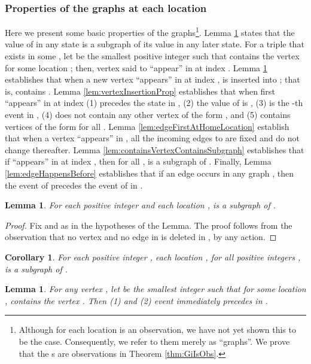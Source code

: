 \documentclass[11pt]{article}
\numberwithin{theorem}{section}
\newtheorem{lemma}[theorem]{Lemma}
\newtheorem{corollary}[theorem]{Corollary}
\begin{document}
\subsubsection{Properties of the graphs  at each location }
\label{subsubsec:proofPartOne}



Here we present some basic properties of the  graphs\footnote{Although  for each location  is an observation, we have not yet shown this to be the case. Consequently, we refer to them merely as ``graphs''. We prove that the s are observations in Theorem \ref{thm:GiIsObs}.}.
Lemma \ref{prop:subgraphNext} states that the value of  in any state is a subgraph of its value in any later state.
For a triple  that exists in some , let  be the smallest positive integer such that  contains the vertex  for some location ; then, vertex  said to ``appear'' in  at index .
Lemma \ref{lem:vertexFirstAtHomeLocation} establishes that when a new vertex  ``appears'' in  at index ,  is inserted into ; that is,  contains . 
Lemma \ref{lem:vertexInsertionProp} establishes that  when  first ``appears'' in  at index  (1)  precedes the state  in , (2) the value of  is , (3)  is the -th  event in , (4)  does not contain any other vertex of the form , and (5)  contains vertices of the form  for all . Lemma \ref{lem:edgeFirstAtHomeLocation} establish that when a vertex  ``appears'' in , all the incoming edges to  are fixed and do not change thereafter. Lemma \ref{lem:containsVertexContainsSubgraph} establishes that if  ``appears'' in  at index , then for all ,  is a subgraph of . Finally, Lemma \ref{lem:edgeHappensBefore} establishes that if an edge  occurs in any graph , then the event of  precedes the event of  in .

\begin{lemma}
\label{prop:subgraphNext}
For each positive integer  and each location ,  is a subgraph of .
\end{lemma}  

\begin{proof}
Fix  and  as in the hypotheses of the Lemma. The proof follows from the observation that no vertex and no edge in  is deleted in , by any action.
\end{proof}
\begin{corollary}\label{cor:subgraphFuture}
For each positive integer , each location , for all positive integers ,  is a subgraph of .
\end{corollary}



\begin{lemma}
\label{lem:vertexFirstAtHomeLocation}
For any vertex , let  be the smallest integer such that
for some location ,  contains the vertex
. Then (1)  and (2) event  immediately precedes  in .
\end{lemma} 
\end{document}
